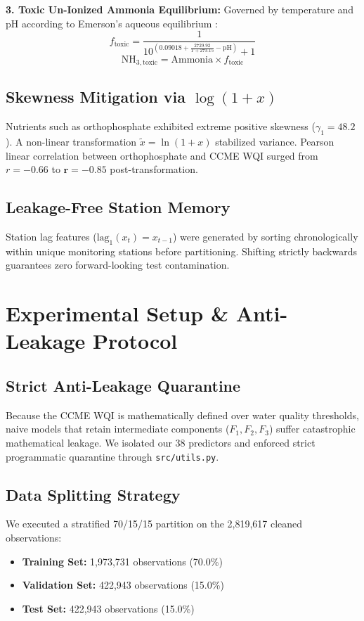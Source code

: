 \documentclass[conference]{IEEEtran}
\begin{document}
\textbf{3. Toxic Un-Ionized Ammonia Equilibrium:} Governed by temperature and pH according to Emerson's aqueous equilibrium \cite{emerson1975aqueous}:
\begin{equation}
f_{\text{toxic}} = \frac{1}{10^{(0.09018 + \frac{2729.92}{T + 273.15} - \text{pH})} + 1}
\end{equation}
\begin{equation}
\text{NH}_{3,\text{toxic}} = \text{Ammonia} \times f_{\text{toxic}}
\end{equation}

\subsection{Skewness Mitigation via $\log(1+x)$}
Nutrients such as orthophosphate exhibited extreme positive skewness ($\gamma_1 = 48.2$). A non-linear transformation $\tilde{x} = \ln(1 + x)$ stabilized variance. Pearson linear correlation between orthophosphate and CCME WQI surged from $r = -0.66$ to $\mathbf{r = -0.85}$ post-transformation.

\subsection{Leakage-Free Station Memory}
Station lag features ($\text{lag}_1(x_t) = x_{t-1}$) were generated by sorting chronologically within unique monitoring stations before partitioning. Shifting strictly backwards guarantees zero forward-looking test contamination.

\section{Experimental Setup \& Anti-Leakage Protocol}
\subsection{Strict Anti-Leakage Quarantine}
Because the CCME WQI is mathematically defined over water quality thresholds, naive models that retain intermediate components ($F_1, F_2, F_3$) suffer catastrophic mathematical leakage. We isolated our 38 predictors and enforced strict programmatic quarantine through \texttt{src/utils.py}.

\subsection{Data Splitting Strategy}
We executed a stratified 70/15/15 partition on the 2,819,617 cleaned observations:
\begin{itemize}
    \item \textbf{Training Set:} 1,973,731 observations (70.0\%)
    \item \textbf{Validation Set:} 422,943 observations (15.0\%)
    \item \textbf{Test Set:} 422,943 observations (15.0\%)
\end{itemize}
\end{document}
